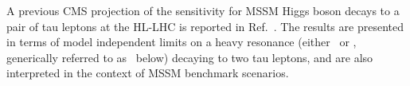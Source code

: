 A previous CMS projection of the sensitivity for
MSSM Higgs boson decays to a pair of tau leptons at the HL-LHC
is reported in Ref.~\cite{FTR-16-002}.
The results are presented in terms of model independent
limits on a heavy resonance (either \PH\ or {\PA},
generically referred to as \PH\ below)
decaying to two tau leptons,
and are also interpreted in the context of MSSM benchmark scenarios.